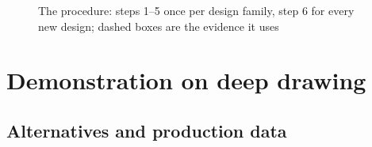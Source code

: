 \documentclass[pdflatex,sn-basic,lineno]{sn-jnl} %
\begin{document}
\begin{figure}[t]
\centering

\caption{The procedure: steps 1--5 once per design family, step 6 for every new design; dashed boxes are the evidence it uses}\label{fig:procedure}
\end{figure}

\section{Demonstration on deep drawing}\label{sec:demo}

\subsection{Alternatives and production data}\label{sec:data}
\end{document}
